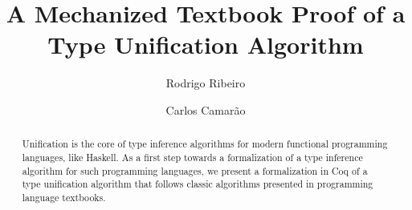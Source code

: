 \documentclass{llncs}
\begin{document}
\lstset{tabsize=3,
	    language=,
	    basicstyle=\footnotesize\ttfamily}

\mainmatter

\title{A Mechanized Textbook Proof of a \\Type Unification Algorithm}


\author{Rodrigo Ribeiro \and Carlos Camar\~ao}


\maketitle  

\begin{abstract}
Unification is the core of type inference algorithms for modern
functional programming languages, like Haskell. As a first step
towards a formalization of a type inference algorithm for such
programming languages, we present a formalization in Coq of a type
unification algorithm that follows classic algorithms presented in
programming language textbooks.
\end{abstract}

\newcommand{\defas}{\ensuremath{\overset{def}{=}}}
\newcommand{\fv}{\ensuremath{\text{FV}}}
\newcommand{\fvc}{\ensuremath{\text{FVC}}}
\newcommand{\eeq}{\ensuremath{\overset{e}{=}}}
\newcommand{\append}{\ensuremath{\texttt{ ++ }}}
\newcommand{\V}{\ensuremath{\mathcal{V}}}
\newcommand{\C}{\ensuremath{\mathbb{C}}}
\newcommand{\wf}{\ensuremath{\text{\it wf\/}}}
\newcommand{\If}{\ensuremath{\text{if }}}
\newcommand{\Let}{\ensuremath{\text{let }}}
\newcommand{\In}{\ensuremath{\text{in }}}
\newcommand{\Then}{\ensuremath{\text{ then }}}
\newcommand{\Else}{\ensuremath{\text{ else }}}
\newcommand{\fail}{\ensuremath{\text{fail}}}
\newcommand{\unify}{\ensuremath{\text{\it unify\/}}}
\newcommand{\Occurs}{\ensuremath{\text{\it ocurrs\/}}}
\newcommand{\dom}{\ensuremath{\text{\it dom\/}}}
\newcommand{\size}{\ensuremath{\text{\it size\/}}}
\newcommand{\unifier}{\ensuremath{\text{\it unifier\/}}}
\newcommand{\True}{\ensuremath{\text{\tt True}}}
\newcommand{\False}{\ensuremath{\text{\tt False}}}
\newtheorem{Lemma}{Lemma}
\newtheorem{Theorem}{Theorem}
\newtheorem{Corollary}{Corollary}
\newtheorem{Definition}{Definition}
\newtheorem{Notation}{Notation Conventions}
\newcommand{\ccite}[1]{\cite{#1}}












\end{document}

